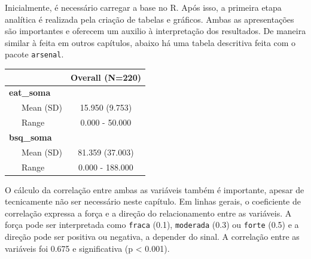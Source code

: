 \documentclass[
]{book}
\newenvironment{Shaded}{\begin{snugshade}}{\end{snugshade}}
\newcommand{\KeywordTok}[1]{\textcolor[rgb]{0.13,0.29,0.53}{\textbf{#1}}}
\newcommand{\NormalTok}[1]{#1}
\newcommand{\OperatorTok}[1]{\textcolor[rgb]{0.81,0.36,0.00}{\textbf{#1}}}
\newcommand{\StringTok}[1]{\textcolor[rgb]{0.31,0.60,0.02}{#1}}
\begin{document}
Inicialmente, é necessário carregar a base no R. Após isso, a primeira etapa analítica é realizada pela criação de tabelas e gráficos. Ambas as apresentações são importantes e oferecem um auxilio à interpretação dos resultados. De maneira similar à feita em outros capítulos, abaixo há uma tabela descritiva feita com o pacote \texttt{arsenal}.

\begin{Shaded}
\end{Shaded}

\begin{longtable}[]{@{}lc@{}}
\toprule
& Overall (N=220)\tabularnewline
\midrule
\endhead
\textbf{eat\_soma} &\tabularnewline
~~~Mean (SD) & 15.950 (9.753)\tabularnewline
~~~Range & 0.000 - 50.000\tabularnewline
\textbf{bsq\_soma} &\tabularnewline
~~~Mean (SD) & 81.359 (37.003)\tabularnewline
~~~Range & 0.000 - 188.000\tabularnewline
\bottomrule
\end{longtable}

O cálculo da correlação entre ambas as variáveis também é importante, apesar de tecnicamente não ser necessário neste capítulo. Em linhas gerais, o coeficiente de correlação expressa a força e a direção do relacionamento entre as variáveis. A força pode ser interpretada como \texttt{fraca} (0.1), \texttt{moderada} (0.3) ou \texttt{forte} (0.5) \citep{Cohen1988} e a direção pode ser positiva ou negativa, a depender do sinal. A correlação entre as variáveis foi 0.675 e significativa (p \textless{} 0.001).

\begin{Shaded}
\end{Shaded}
\end{document}
